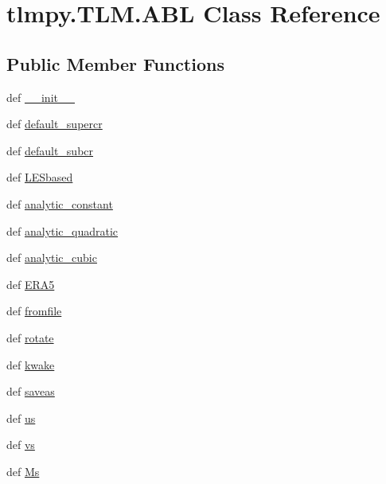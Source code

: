 \hypertarget{classtlmpy_1_1TLM_1_1ABL}{
\section{tlmpy.TLM.ABL Class Reference}
\label{classtlmpy_1_1TLM_1_1ABL}
}
\subsection*{Public Member Functions}
\begin{DoxyCompactItemize}
\item 
def \hyperlink{classtlmpy_1_1TLM_1_1ABL_a8ae8708716d331035614115aad416139}{\_\-\_\-init\_\-\_\-}
\item 
def \hyperlink{classtlmpy_1_1TLM_1_1ABL_a7d8b68025ec06148164a6cec2fea0969}{default\_\-supercr}
\item 
def \hyperlink{classtlmpy_1_1TLM_1_1ABL_a9d12805aac8b7780144f3ab777b6a493}{default\_\-subcr}
\item 
def \hyperlink{classtlmpy_1_1TLM_1_1ABL_a151cf679c360998483ca293efd5519c0}{LESbased}
\item 
def \hyperlink{classtlmpy_1_1TLM_1_1ABL_ad5a2d4bc169fc2d3c1d9bcd0db0abf2b}{analytic\_\-constant}
\item 
def \hyperlink{classtlmpy_1_1TLM_1_1ABL_a35a1e5535c445547850b5024c93998af}{analytic\_\-quadratic}
\item 
def \hyperlink{classtlmpy_1_1TLM_1_1ABL_a4f00bd1fa90c964896b1299d2c0ad08c}{analytic\_\-cubic}
\item 
def \hyperlink{classtlmpy_1_1TLM_1_1ABL_a3ac0ae6e88d3d597b90b37e7c55bc888}{ERA5}
\item 
def \hyperlink{classtlmpy_1_1TLM_1_1ABL_a5fb3ebdd56b8906b2708a7bf0b058445}{fromfile}
\item 
def \hyperlink{classtlmpy_1_1TLM_1_1ABL_a01974ee89c87730b7ac124961b018a8a}{rotate}
\item 
def \hyperlink{classtlmpy_1_1TLM_1_1ABL_aa581681181753fd8f76fcaf5a4f57cc5}{kwake}
\item 
def \hyperlink{classtlmpy_1_1TLM_1_1ABL_a89ac6588f29d2fbd994e80bc25e93ae1}{saveas}
\item 
def \hyperlink{classtlmpy_1_1TLM_1_1ABL_a3b230b5eab0998fe08c6f50939d1798a}{us}
\item 
def \hyperlink{classtlmpy_1_1TLM_1_1ABL_aa6fbc3d7b3cdc4e12333bd3758929db6}{vs}
\item 
def \hyperlink{classtlmpy_1_1TLM_1_1ABL_aec4bd3e76d90584947689fd6e88c1a1e}{Ms}
\item 

\end{DoxyCompactItemize}
